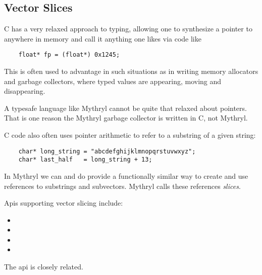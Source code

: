 \cutend*
\subsection{Vector Slices}
\label{section:tut:full-monte:vector-slices}

C has a very relaxed approach to typing, allowing one to synthesize a 
pointer to anywhere in memory and call it anything one likes via code 
like

\begin{verbatim}
    float* fp = (float*) 0x1245;
\end{verbatim}

This is often used to advantage in such situations as in writing 
memory allocators and garbage collectors, where typed values are 
appearing, moving and disappearing.

A typesafe language like Mythryl cannot be quite that relaxed about pointers. 
That is one reason the Mythryl garbage collector is written in C, not Mythryl.

C code also often uses pointer arithmetic to refer to a substring of a given string:

\begin{verbatim}
    char* long_string = "abcdefghijklmnopqrstuvwxyz";
    char* last_half   = long_string + 13;
\end{verbatim}

In Mythryl we can and do provide a functionally similar way to create 
and use references to substrings and subvectors.  Mythryl calls these 
references {\it slices}.

Apis supporting vector slicing include:
\begin{itemize}
\item {}
\item {}
\item {}
\item {}
\end{itemize}
The  api is closely related.

